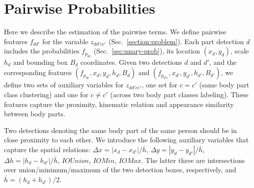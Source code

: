 \section{Pairwise Probabilities}
\label{sec:unary-and-pairwise}
Here we describe the estimation of the pairwise terms.
We define pairwise features $f_{dd'}$ for
the variable $z_{dd'cc'}$ (Sec.~\ref{section:problem}).
Each part detection $d$ includes the probabilities $f_{p_{dc}}$
(Sec.~\ref{sec:unary-prob}), its location $(x_d,y_d)$, scale $h_d$ and
bounding box $B_d$ coordinates.  Given two detections $d$ and $d'$,
and the corresponding features $( f_{p_{dc}}, x_d, y_d, h_d, B_d)$ and
$(f_{p_{d'c}}, x_{d'}, y_{d'}, h_{d'}, B_{d'})$, we define two sets of
auxiliary variables for $z_{dd'cc'}$, one set for $c = c'$ (same body
part class clustering) and one for $c\neq c'$ (across two body part
classes labeling).  These features capture the proximity, kinematic
relation and appearance similarity between body parts.

Two detections denoting the same body part of the same person should
be in close proximity to each other. We introduce the following
auxiliary variables that capture the spatial relations: $\Delta x =
|x_d-x_{d'}|/\bar{h}$, $\Delta y = |y_d-y_{d'}|/\bar{h}$, $\Delta h =
|h_d-h_{d'}|/\bar{h}$, $IOUnion$, $IOMin$, $IOMax$. The latter three
are intersections over union/minimum/maximum of the two detection
boxes, respectively, and $\bar{h} = (h_d + h_{d'})/2$.

